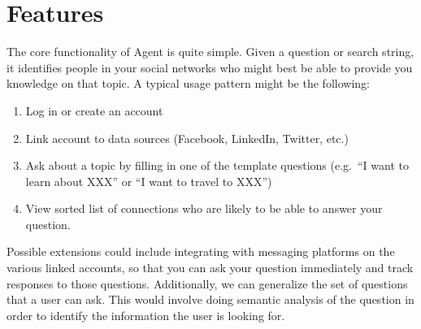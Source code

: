 \section{Features}
\label{sec:features}
The core functionality of Agent is quite simple. Given a question or search
string, it identifies people in your social networks who might best be able to
provide you knowledge on that topic. A typical usage pattern might be the
following:
\begin{enumerate}
\item Log in or create an account
\item Link account to data sources (Facebook, LinkedIn, Twitter, etc.)
\item Ask about a topic by filling in one of the template questions (e.g.\ ``I
want to learn about XXX'' or ``I want to travel to XXX'')
\item View sorted list of connections who are likely to be able to answer your
question.
\end{enumerate}

Possible extensions could include integrating with messaging platforms on the
various linked accounts, so that you can ask your question immediately and track
responses to those questions. Additionally, we can generalize the set of
questions that a user can ask. This would involve doing semantic analysis of the
question in order to identify the information the user is looking for.
